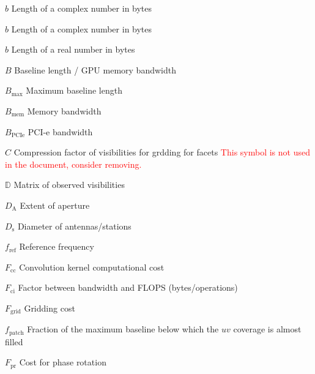 \documentclass[11pt,a4paper]{article}
\newcommand{\bytes}{b} %
\newcommand{\cbytes}{b} %
\newcommand{\rbytes}{b} %
\newcommand{\bl}{B} %
\newcommand{\maxbl}{B_{\mathrm{max}}} %
\newcommand{\membw}{B_\mathrm{mem}} %
\newcommand{\pciebw}{B_\mathrm{PCIe}} %
\newcommand{\viscompr}{C} %
\newcommand{\vism}{\mathbb{D}} %
\newcommand{\da}{D_{\mathrm A}} %
\newcommand{\ds}{D_{\mathrm s}} %
\newcommand{\reff}{f_\mathrm{ref}} %
\newcommand{\fcc}{F_{\mathrm{cc}}} %
\newcommand{\fci}{F_{\mathrm{ci}}} %
\newcommand{\fgrid}{F_{\mathrm{grid}}} %
\newcommand{\fpatch}{f_\mathrm{patch}} %
\newcommand{\fpr}{F_\mathrm{pr}} %
\newcommand{\uv}{uv} %
\begin{document}
\clearpage \sdplistofsymbols
\begin{basedescript}{\desclabelstyle{\pushlabel}\desclabelwidth{6em}}
\item[$\bytes$] Length of a complex number in bytes \vspace{-0.2cm}
\item[$\cbytes$] Length of a complex number in bytes \vspace{-0.2cm}
\item[$\rbytes$] Length of a real number in bytes \vspace{-0.2cm}
\item[$\bl$] Baseline length / GPU memory bandwidth \vspace{-0.2cm}
\item[$\maxbl$] Maximum baseline length \vspace{-0.2cm}
\item[$\membw$] Memory bandwidth \vspace{-0.2cm}
\item [$\pciebw$] PCI-e bandwidth \vspace{-0.2cm}
\item[$\viscompr$] Compression factor of visibilities for grdding for facets
  \textcolor{red}{This symbol is not used in the document, consider removing.}
  \vspace{-0.2cm}
\item[$\vism$] Matrix of observed visibilities \vspace{-0.2cm}
\item[$\da$] Extent of aperture \vspace{-0.2cm}
\item[$\ds$] Diameter of antennas/stations \vspace{-0.2cm}
\item[$\reff$] Reference frequency\vspace{-0.2cm}
\item[$\fcc$] Convolution kernel computational cost\vspace{-0.2cm}
\item[$\fci$] Factor between bandwidth and FLOPS (bytes/operations)\vspace{-0.2cm}
\item[$\fgrid$] Gridding cost\vspace{-0.2cm}
\item[$\fpatch$] Fraction of the maximum baseline below which the $\uv$
  coverage is almost filled\vspace{-0.2cm}
\item[$\fpr$] Cost for phase rotation\vspace{-0.2cm}

\end{basedescript}
\end{document}

